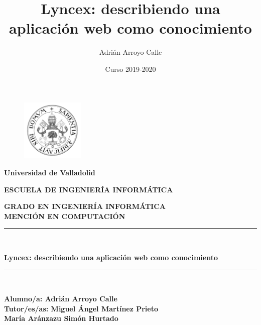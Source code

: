 \documentclass[openright,twoside,12pt]{book}
\title{Lyncex: describiendo una aplicación web como conocimiento}
\author{Adrián Arroyo Calle}
\date{Curso 2019-2020}
\begin{document}
\begin{titlepage}

\begin{center}
\vspace*{-1in}
\begin{figure}[htb]
\begin{center}
\includegraphics[width=3cm]{uva.png}
\end{center}
\end{figure}
\begin{large}
\textbf{Universidad de Valladolid}
\end{large}

\vspace*{0.15in}

\vspace*{0.6in}
\begin{large}
\textbf{ESCUELA DE INGENIERÍA INFORMÁTICA}

\end{large}
\vspace*{0.2in}
\textbf{ GRADO EN INGENIERÍA INFORMÁTICA}\\
\textbf{ MENCIÓN EN COMPUTACIÓN }
\vspace*{0.5in}
\rule{140mm}{0.1mm}\\
\vspace*{0.3in}
\begin{large}
\textbf{Lyncex: describiendo una aplicación web como conocimiento}
\end{large}
\vspace*{0.5in}
\rule{140mm}{0.1mm}\\
\vspace*{2in}
\begin{large}
\begin{flushright}
\textbf{Alumno/a: Adrián Arroyo Calle \\
\vspace*{0.3in}
Tutor/es/as: Miguel Ángel Martínez Prieto \\ María Aránzazu Simón Hurtado}
\end{flushright}
\end{large}
\end{center}

\end{titlepage}
\end{document}
